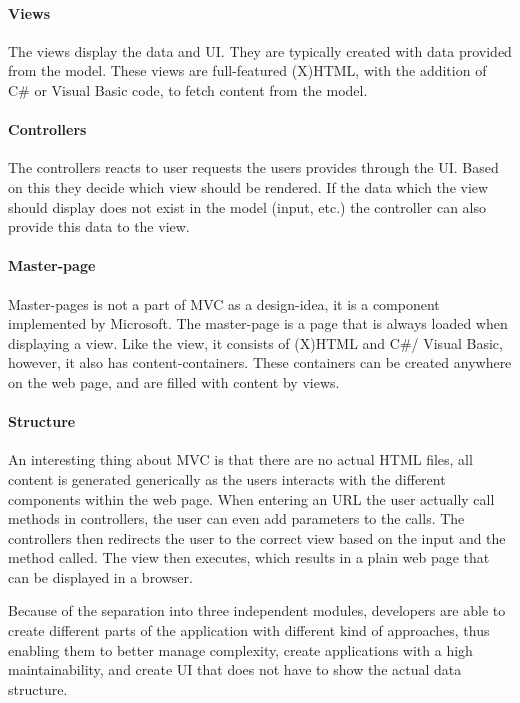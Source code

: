 \paragraph{Views}
The views display the data and UI. They are typically created with data provided from the model. These views are full-featured (X)HTML, with the addition of C\# or Visual Basic code, to fetch content from the model.

\paragraph{Controllers}
The controllers reacts to user requests the users provides through the UI. Based on this they decide which view should be rendered. If the data which the view should display does not exist in the model (input, etc.) the controller can also provide this data to the view.

\paragraph{Master-page}
Master-pages is not a part of MVC as a design-idea, it is a component implemented by Microsoft. The master-page is a page that is always loaded when displaying a view. Like the view, it consists of (X)HTML and C\#/ Visual Basic, however, it also has content-containers. These containers can be created anywhere on the web page, and are filled with content by views.

\paragraph{Structure}
An interesting thing about MVC is that there are no actual HTML files, all content is generated generically as the users interacts with the different components within the web page. When entering an URL the user actually call methods in controllers, the user can even add parameters to the calls. The controllers then redirects the user to the correct view based on the input and the method called. The view then executes, which results in a plain web page that can be displayed in a browser.

Because of the separation into three independent modules, developers are able to create different parts of the application with different kind of approaches, thus enabling them to better manage complexity, create applications with a high maintainability, and create UI that does not have to show the actual data structure.

